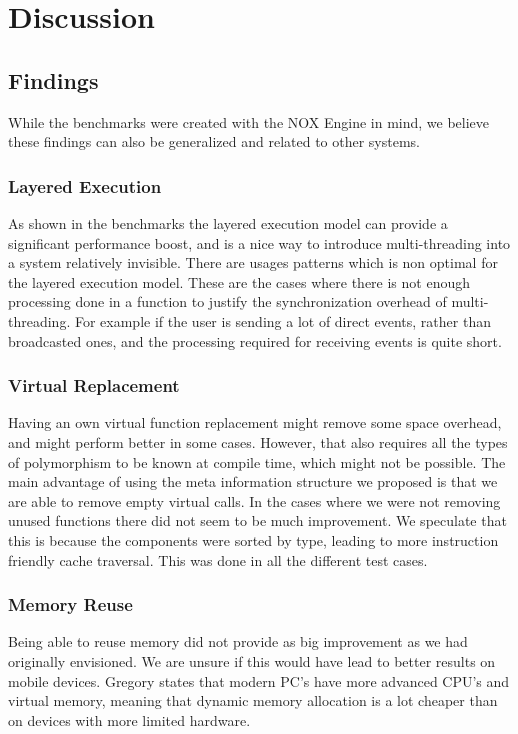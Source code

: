 \chapter{Discussion}
\label{chap:discussion}

\section{Findings}
While the benchmarks were created with the NOX Engine in mind,
we believe these findings can also be generalized and related to other systems.

\subsection{Layered Execution}
As shown in the benchmarks the layered execution model can provide a significant performance boost,
and is a nice way to introduce multi-threading into a system relatively invisible.
There are usages patterns which is non optimal for the layered execution model.
These are the cases where there is not enough processing done in a function to justify the synchronization overhead
of multi-threading.
For example if the user is sending a lot of direct events, rather than broadcasted ones,
and the processing required for receiving events is quite short.

\subsection{Virtual Replacement}
Having an own virtual function replacement might remove some space overhead, and might perform better in some cases.
However, that also requires all the types of polymorphism to be known at compile time, which might
not be possible.
The main advantage of using the meta information structure we proposed is that we are able to remove empty
virtual calls.
In the cases where we were not removing unused functions there did not seem to be much improvement.
We speculate that this is because the components were sorted by type, leading to more instruction friendly
cache traversal. This was done in all the different test cases.

\subsection{Memory Reuse}
Being able to reuse memory did not provide as big improvement as we had originally envisioned.
We are unsure if this would have lead to better results on mobile devices.
Gregory\cite[p.262]{game_engine_architecture} states that modern PC's have more advanced CPU's and virtual
memory, meaning that dynamic memory allocation is a lot cheaper than on devices with more limited hardware.

